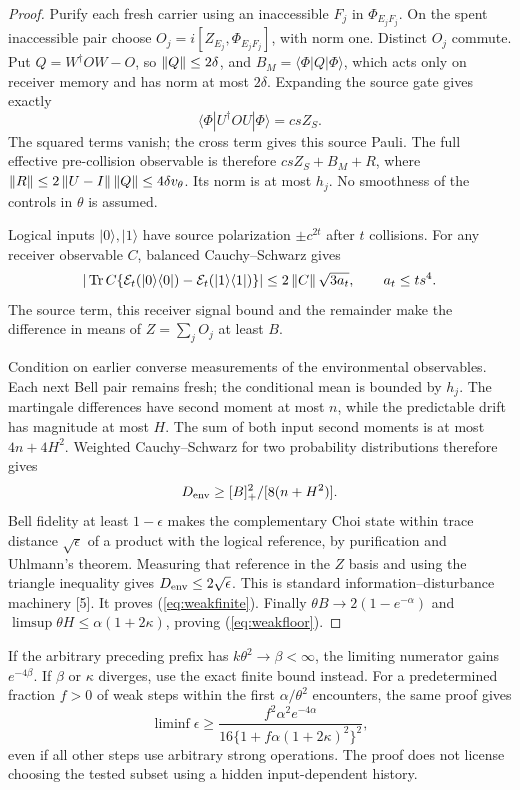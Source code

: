\begin{proof}
Purify each fresh carrier using an inaccessible $F_j$ in $\Phi_{E_jF_j}$.
On the spent inaccessible pair choose $O_j=i[Z_{E_j},\Phi_{E_jF_j}]$, with
norm one. Distinct $O_j$ commute. Put $Q=W^\dagger OW-O$, so
$\left\lVert Q\right\rVert\le2\delta$, and $B_M=\langle\Phi|Q|\Phi\rangle$, which acts
only on receiver memory and has norm at most $2\delta$. Expanding the source
gate gives exactly
\[
 \langle\Phi|U^\dagger OU|\Phi\rangle=cs Z_S.
\]
The squared terms vanish; the cross term gives this source Pauli. The full
effective pre-collision observable is therefore $csZ_S+B_M+R$, where
$\left\lVert R\right\rVert\le2\left\lVert U-I\right\rVert\left\lVert Q\right\rVert\le4\delta v_\theta$. Its norm is at
most $h_j$. No smoothness of the controls in $\theta$ is assumed.

Logical inputs $|0\rangle,|1\rangle$ have source polarization
$\pm c^{2t}$ after $t$ collisions. For any receiver observable $C$,
balanced Cauchy--Schwarz gives
\[
 |\operatorname{Tr} C\{\mathcal E_t(|0\rangle\langle0|)-\mathcal E_t(|1\rangle\langle1|)\}|
 \le2\left\lVert C\right\rVert\sqrt{3a_t},\qquad a_t\le ts^4.
\]
The source term, this receiver signal bound and the remainder make the
difference in means of $Z=\sum_jO_j$ at least $B$.

Condition on earlier converse measurements of the environmental observables.
Each next Bell pair remains fresh; the conditional mean is bounded by $h_j$.
The martingale differences have second moment at most $n$, while the
predictable drift has magnitude at most $H$. The sum of both input second
moments is at most $4n+4H^2$. Weighted Cauchy--Schwarz for two probability
distributions therefore gives
\[
 D_{\rm env}\ge[B]_+^2/[8(n+H^2)].
\]
Bell fidelity at least $1-\epsilon$ makes the complementary Choi state within
trace distance $\sqrt\epsilon$ of a product with the logical reference, by
purification and Uhlmann's theorem. Measuring that reference in the $Z$ basis
and using the triangle inequality gives $D_{\rm env}\le2\sqrt\epsilon$.
This is standard information--disturbance machinery [5]. It proves
(\ref{eq:weakfinite}). Finally
$\theta B\to2(1-e^{-\alpha})$ and
$\limsup\theta H\le\alpha(1+2\kappa)$, proving (\ref{eq:weakfloor}).
\end{proof}

If the arbitrary preceding prefix has $k\theta^2\to\beta<\infty$, the
limiting numerator gains $e^{-4\beta}$. If $\beta$ or $\kappa$ diverges,
use the exact finite bound instead. For a predetermined fraction $f>0$ of
weak steps within the first $\alpha/\theta^2$ encounters, the same proof
gives
\[
 \liminf\epsilon\ge
 \frac{f^2\alpha^2e^{-4\alpha}}
 {16\{1+f\alpha(1+2\kappa)^2\}^2},
\]
even if all other steps use arbitrary strong operations. The proof does not
license choosing the tested subset using a hidden input-dependent history.

